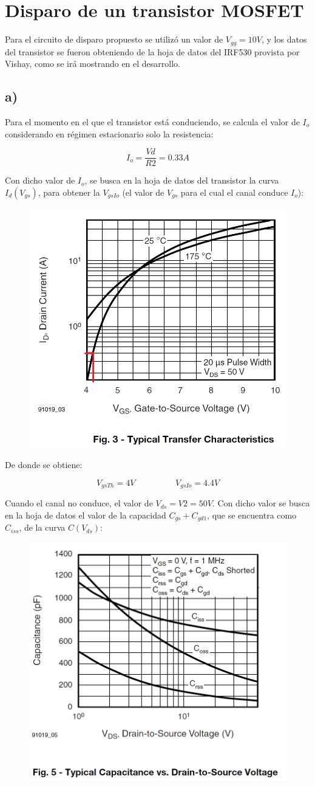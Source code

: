 \documentclass[e4_tp1_main.tex]{subfiles}
\begin{document}
\section{Disparo de un transistor MOSFET}

Para el circuito de disparo propuesto se utilizó un valor de $V_{gg}=10V$, y los datos del transistor se fueron obteniendo de la hoja de datos del IRF530 provista por Vishay, como se irá mostrando en el desarrollo.


\subsection*{a)}

Para el momento en el que el transistor está conduciendo, se calcula el valor de $I_o$ considerando en régimen estacionario solo la resistencia:

\[
I_o = \frac{Vd}{R2} = 0.33A
\]

Con dicho valor de $I_o$, se busca en la hoja de datos del transistor la curva $I_d(V_{gs})$, para obtener la $V_{gsIo}$ (el valor de $V_{gs}$ para el cual el canal conduce $I_o$):

\begin{figure}[H]
\centering
\includegraphics[width=0.5\linewidth]{Images/Ej1-VgsIo.png}
\end{figure}

De donde se obtiene:

\[
V_{gsTh} = 4V \hspace{2cm} V_{gsIo} = 4.4V
\]

Cuando el canal no conduce, el valor de $V_{ds} = V2 = 50V$. Con dicho valor se busca en la hoja de datos el valor de la capacidad $C_{gs} + C_{gd1}$, que se encuentra como $C_{iss}$, de la curva $C(V_{ds})$:

\begin{figure}[H]
\centering
\includegraphics[width=0.5\linewidth]{Images/Ej1-Capacidades.png}
\end{figure}
\end{document}
